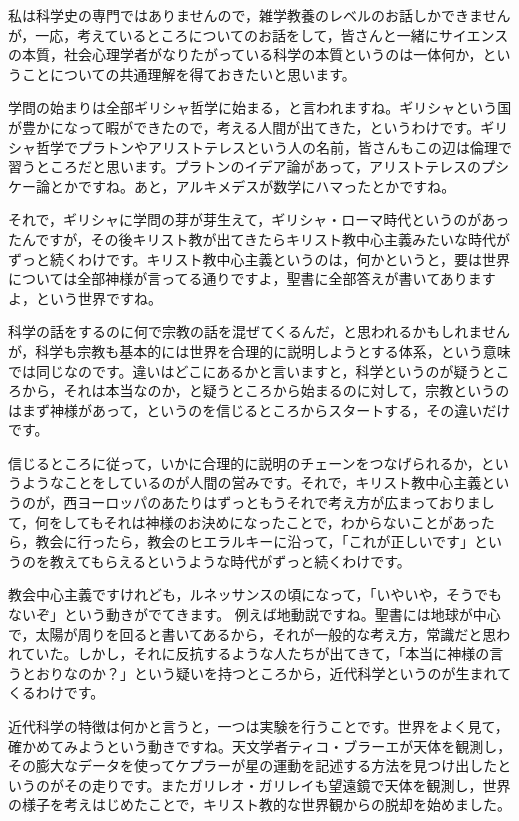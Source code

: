 \documentclass{ltjsbook}
\begin{document}
私は科学史の専門ではありませんので，雑学教養のレベルのお話しかできませんが，一応，考えているところについてのお話をして，皆さんと一緒にサイエンスの本質，社会心理学者がなりたがっている科学の本質というのは一体何か，ということについての共通理解を得ておきたいと思います。

学問の始まりは全部ギリシャ哲学に始まる，と言われますね。ギリシャという国が豊かになって暇ができたので，考える人間が出てきた，というわけです。ギリシャ哲学でプラトンやアリストテレスという人の名前，皆さんもこの辺は倫理で習うところだと思います。プラトンのイデア論があって，アリストテレスのプシケー論とかですね。あと，アルキメデスが数学にハマったとかですね。

それで，ギリシャに学問の芽が芽生えて，ギリシャ・ローマ時代というのがあったんですが，その後キリスト教が出てきたらキリスト教中心主義みたいな時代がずっと続くわけです。キリスト教中心主義というのは，何かというと，要は世界については全部神様が言ってる通りですよ，聖書に全部答えが書いてありますよ，という世界ですね。

科学の話をするのに何で宗教の話を混ぜてくるんだ，と思われるかもしれませんが，科学も宗教も基本的には世界を合理的に説明しようとする体系，という意味では同じなのです。違いはどこにあるかと言いますと，科学というのが疑うところから，それは本当なのか，と疑うところから始まるのに対して，宗教というのはまず神様があって，というのを信じるところからスタートする，その違いだけです。

信じるところに従って，いかに合理的に説明のチェーンをつなげられるか，というようなことをしているのが人間の営みです。それで，キリスト教中心主義というのが，西ヨーロッパのあたりはずっともうそれで考え方が広まっておりまして，何をしてもそれは神様のお決めになったことで，わからないことがあったら，教会に行ったら，教会のヒエラルキーに沿って，「これが正しいです」というのを教えてもらえるというような時代がずっと続くわけです。

教会中心主義ですけれども，ルネッサンスの頃になって，「いやいや，そうでもないぞ」という動きがでてきます。
例えば地動説ですね。聖書には地球が中心で，太陽が周りを回ると書いてあるから，それが一般的な考え方，常識だと思われていた。しかし，それに反抗するような人たちが出てきて，「本当に神様の言うとおりなのか？」という疑いを持つところから，近代科学というのが生まれてくるわけです。

近代科学の特徴は何かと言うと，一つは実験を行うことです。世界をよく見て，確かめてみようという動きですね。天文学者ティコ・ブラーエが天体を観測し，その膨大なデータを使ってケプラーが星の運動を記述する方法を見つけ出したというのがその走りです。またガリレオ・ガリレイも望遠鏡で天体を観測し，世界の様子を考えはじめたことで，キリスト教的な世界観からの脱却を始めました。
\end{document}
